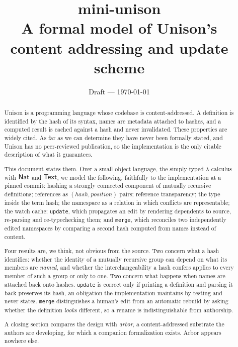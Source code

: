 \documentclass[11pt]{article}
\title{\textbf{mini-unison}\\[4pt]
\large A formal model of Unison's content addressing and update scheme}
\author{}
\date{Draft --- \today}
\theoremstyle{definition}
\theoremstyle{plain}
\theoremstyle{remark}
\begin{document}
\maketitle

\begin{abstract}
Unison is a programming language whose codebase is content-addressed. A definition is identified by
the hash of its syntax, names are metadata attached to hashes, and a computed result is cached
against a hash and never invalidated. These properties are widely cited. As far as we can determine
they have never been formally stated, and Unison has no peer-reviewed publication, so the
implementation is the only citable description of what it guarantees.

This document states them. Over a small object language, the simply-typed $\lambda$-calculus with
$\mathsf{Nat}$ and $\mathsf{Text}$, we model the following, faithfully to the implementation at a pinned commit:
hashing a strongly connected component of mutually recursive definitions; references as
$(\mathit{hash}, \mathit{position})$ pairs; reference transparency; the type inside the term hash;
the namespace as a relation in which conflicts are representable; the watch cache; \texttt{update},
which propagates an edit by rendering dependents to source, re-parsing and re-typechecking them; and
\texttt{merge}, which reconciles two independently edited namespaces by comparing a second hash
computed from names instead of content.

Four results are, we think, not obvious from the source. Two concern what a hash identifies: whether
the identity of a mutually recursive group can depend on what its members are \emph{named}, and
whether the interchangeability a hash confers applies to every member of such a group or only to one.
Two concern what happens when names are attached back onto hashes. \texttt{update} is correct only if
printing a definition and parsing it back preserves its hash, an obligation the implementation
maintains by testing and never states. \texttt{merge} distinguishes a human's edit from an automatic
rebuild by asking whether the definition \emph{looks} different, so a rename is indistinguishable
from authorship.

A closing section compares the design with \emph{arbor}, a content-addressed substrate the authors
are developing, for which a companion formalization exists. Arbor appears nowhere else.
\end{abstract}

\tableofcontents
\end{document}

